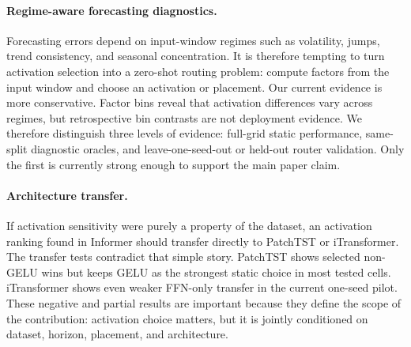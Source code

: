 \paragraph{Regime-aware forecasting diagnostics.}
Forecasting errors depend on input-window regimes such as volatility, jumps, trend consistency, and seasonal concentration. It is therefore tempting to turn activation selection into a zero-shot routing problem: compute factors from the input window and choose an activation or placement. Our current evidence is more conservative. Factor bins reveal that activation differences vary across regimes, but retrospective bin contrasts are not deployment evidence. We therefore distinguish three levels of evidence: full-grid static performance, same-split diagnostic oracles, and leave-one-seed-out or held-out router validation. Only the first is currently strong enough to support the main paper claim.

\paragraph{Architecture transfer.}
If activation sensitivity were purely a property of the dataset, an activation ranking found in Informer should transfer directly to PatchTST or iTransformer. The transfer tests contradict that simple story. PatchTST shows selected non-GELU wins but keeps GELU as the strongest static choice in most tested cells. iTransformer shows even weaker FFN-only transfer in the current one-seed pilot. These negative and partial results are important because they define the scope of the contribution: activation choice matters, but it is jointly conditioned on dataset, horizon, placement, and architecture.
